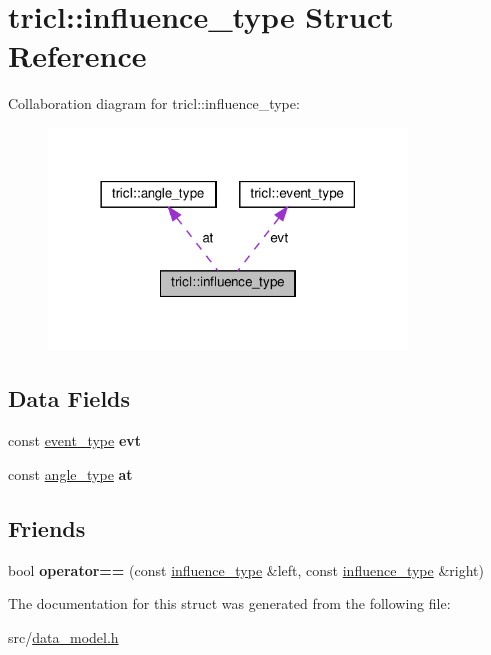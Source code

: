 \hypertarget{structtricl_1_1influence__type}{}\section{tricl\+:\+:influence\+\_\+type Struct Reference}
\label{structtricl_1_1influence__type}


Collaboration diagram for tricl\+:\+:influence\+\_\+type\+:\nopagebreak
\begin{figure}[H]
\begin{center}
\leavevmode
\includegraphics[width=270pt]{d0/dba/structtricl_1_1influence__type__coll__graph}
\end{center}
\end{figure}
\subsection*{Data Fields}
\begin{DoxyCompactItemize}
\item 
\mbox{\label{structtricl_1_1influence__type_a9e3a80224b266e0ff8041644e372fe19}} 
const \hyperlink{structtricl_1_1event__type}{event\+\_\+type} {\bfseries evt}
\item 
\mbox{\label{structtricl_1_1influence__type_a9d6fecd13fbb3e7b0686556d80b3b537}} 
const \hyperlink{structtricl_1_1angle__type}{angle\+\_\+type} {\bfseries at}
\end{DoxyCompactItemize}
\subsection*{Friends}
\begin{DoxyCompactItemize}
\item 
\mbox{\label{structtricl_1_1influence__type_a4f5b42686b09f580c15f8fa9f3aa296f}} 
bool {\bfseries operator==} (const \hyperlink{structtricl_1_1influence__type}{influence\+\_\+type} \&left, const \hyperlink{structtricl_1_1influence__type}{influence\+\_\+type} \&right)
\end{DoxyCompactItemize}


The documentation for this struct was generated from the following file\+:\begin{DoxyCompactItemize}
\item 
src/\hyperlink{data__model_8h}{data\+\_\+model.\+h}\end{DoxyCompactItemize}
